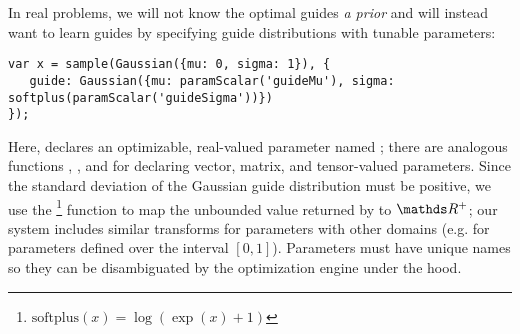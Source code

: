 In real problems, we will not know the optimal guides \emph{a prior} and will instead want to learn guides by specifying guide distributions with tunable parameters:
\begin{lstlisting}
var x = sample(Gaussian({mu: 0, sigma: 1}), {
   guide: Gaussian({mu: paramScalar('guideMu'), sigma: softplus(paramScalar('guideSigma'))})
});
\end{lstlisting}
Here,  declares an optimizable, real-valued parameter named ; there are analogous functions , , and  for declaring vector, matrix, and tensor-valued parameters.
Since the standard deviation  of the Gaussian guide distribution must be positive, we use the \footnote{$\text{softplus}(x) = \log(\exp(x) + 1)$} function to map the unbounded value returned by  to $\Reals^{+}$; our system includes similar transforms for parameters with other domains (e.g.  for parameters defined over the interval $[0, 1]$).
Parameters must have unique names so they can be disambiguated by the optimization engine under the hood.

